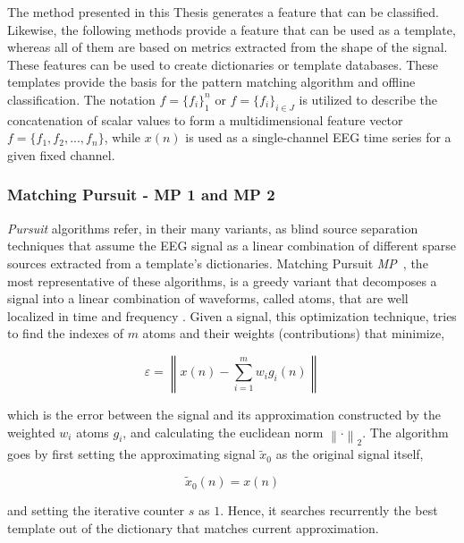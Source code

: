 The method presented in this Thesis generates a feature that can be classified.  Likewise, the following methods provide a feature that can be used as a template, whereas all of them are based on metrics extracted from the shape of the signal. These features can be used to create dictionaries or template databases.  These templates provide the basis for the pattern matching algorithm and offline classification.  The notation $f=\{f_i\}_{1}^{n} $ or $f=\{f_i\}_{i \in J}^{} $  is utilized to describe the concatenation of scalar values to form a multidimensional feature vector $f=\{f_1,f_2,...,f_n\}$, while $x(n)$ is used as a single-channel EEG time series for a given fixed channel.

\subsubsection{Matching Pursuit - MP 1 and MP 2}

\textit{Pursuit} algorithms refer, in their many variants, as blind source separation \cite{Vincent2010} techniques that assume the EEG signal as a linear combination of different sparse sources extracted from a template's dictionaries.  Matching Pursuit \textit{MP}~\cite{Mallat1993}, the most representative of these algorithms, is a greedy variant that decomposes a signal into a linear combination of waveforms, called atoms, that are well localized in time and frequency \cite{ChandranKS2016}.  Given a signal, this optimization technique, tries to find the indexes of $m$ atoms and their weights (contributions) that minimize,


\begin{equation}
\varepsilon =  \left\lVert   x(n) - \sum_{i=1}^{m} w_i g_{i}(n)   \right\rVert
\label{eq:mperror}
\end{equation}

\noindent which is the error between the signal and its approximation constructed by the weighted $w_i$ atoms $g_{i}$, and calculating the euclidean norm ${\left\lVert \cdot \right\rVert}_{2}$.  The algorithm goes by first setting the approximating signal $\tilde{x}_{0}$  as the original signal itself,  

\begin{equation}
\tilde{x}_{0}(n) = x(n)
\label{eq:mp2}
\end{equation}

\noindent and setting the iterative counter $s$ as $1$. Hence, it searches recurrently the best template out of the dictionary  that matches current approximation.  

